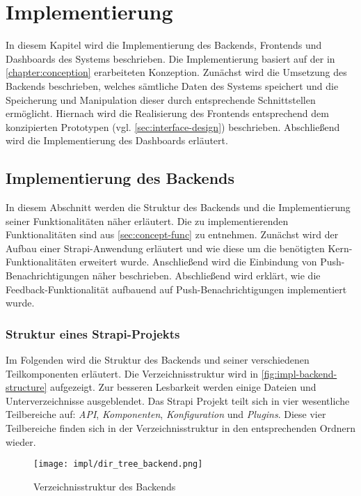 \chapter{Implementierung} \label{chapter:implementation}

In diesem Kapitel wird die Implementierung des Backends, Frontends und
Dashboards des Systems beschrieben. Die Implementierung basiert auf der in
\autoref{chapter:conception} erarbeiteten Konzeption.  Zunächst wird die
Umsetzung des Backends beschrieben, welches sämtliche Daten des Systems
speichert und die Speicherung und Manipulation dieser durch entsprechende
Schnittstellen ermöglicht. Hiernach wird die Realisierung des Frontends
entsprechend dem konzipierten Prototypen (vgl. \autoref{sec:interface-design})
beschrieben. Abschließend wird die Implementierung des Dashboards erläutert.

\section{Implementierung des Backends}

In diesem Abschnitt werden die Struktur des Backends und die Implementierung
seiner Funktionalitäten näher erläutert. Die zu implementierenden
Funktionalitäten sind aus \autoref{sec:concept-func} zu entnehmen. Zunächst wird
der Aufbau einer Strapi-Anwendung erläutert und wie diese um die benötigten
Kern-Funktionalitäten erweitert wurde. Anschließend wird die Einbindung von
Push-Benachrichtigungen näher beschrieben. Abschließend wird erklärt, wie die
Feedback-Funktionalität aufbauend auf Push-Benachrichtig\-ung\-en implementiert
wurde.

\subsection{Struktur eines Strapi-Projekts} \label{ssec:impl-backend-structure}

Im Folgenden wird die Struktur des Backends und seiner verschiedenen
Teilkomponenten erläutert. Die Verzeichnisstruktur wird in
\autoref{fig:impl-backend-structure} aufgezeigt. Zur besseren Lesbarkeit werden
einige Dateien und Unterverzeichnisse ausgeblendet. Das Strapi Projekt teilt
sich in vier wesentliche Teilbereiche auf: \textit{API}, \textit{Komponenten},
\textit{Konfiguration} und \textit{Plugins}. Diese vier Teilbereiche finden sich
in der Verzeichnisstruktur in den entsprechenden Ordnern wieder.

\begin{figure}[htpb]
    \centering
    \texttt{[image: impl/dir\_tree\_backend.png]}
    \caption{Verzeichnisstruktur des Backends}
    \label{fig:impl-backend-structure}
\end{figure}

